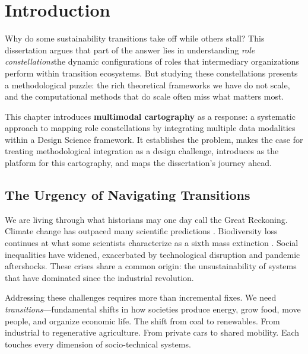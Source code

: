 \documentclass[../main.tex]{subfiles}
\begin{document}
\chapter{Introduction}
\margintoc

\begin{chapteroverview}
Why do some sustainability transitions take off while others stall? This dissertation argues that part of the answer lies in understanding \emph{role constellations}\textemdash the dynamic configurations of roles that intermediary organizations perform within transition ecosystems. But studying these constellations presents a methodological puzzle: the rich theoretical frameworks we have do not scale, and the computational methods that do scale often miss what matters most.

This chapter introduces \textbf{multimodal cartography} as a response: a systematic approach to mapping role constellations by integrating multiple data modalities within a Design Science framework. It establishes the problem, makes the case for treating methodological integration as a design challenge, introduces \RoleBox as the platform for this cartography, and maps the dissertation's journey ahead.
\end{chapteroverview}


\section{The Urgency of Navigating Transitions}
\label{sec:intro:urgency}

We are living through what historians may one day call the Great Reckoning. Climate change has outpaced many scientific predictions \cite{ipcc2023ar6}. Biodiversity loss continues at what some scientists characterize as a sixth mass extinction \cite{ipbes2019global}. Social inequalities have widened, exacerbated by technological disruption and pandemic aftershocks. These crises share a common origin: the unsustainability of systems that have dominated since the industrial revolution.

Addressing these challenges requires more than incremental fixes. We need \emph{transitions}---fundamental shifts in how societies produce energy, grow food, move people, and organize economic life. The shift from coal to renewables. From industrial to regenerative agriculture. From private cars to shared mobility. Each touches every dimension of socio-technical systems.
\end{document}

